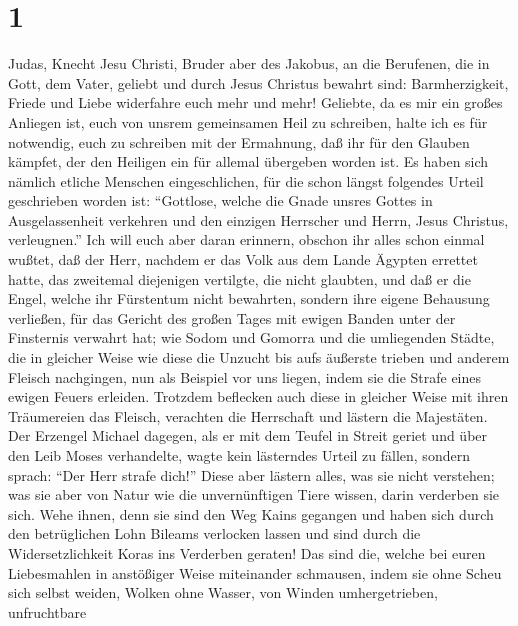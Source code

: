 \hypertarget{section}{%
\section{1}\label{section}}

 Judas, Knecht Jesu Christi, Bruder aber des Jakobus, an
die Berufenen, die in Gott, dem Vater, geliebt und durch Jesus Christus
bewahrt sind:  Barmherzigkeit, Friede und Liebe widerfahre
euch mehr und mehr!  Geliebte, da es mir ein großes
Anliegen ist, euch von unsrem gemeinsamen Heil zu schreiben, halte ich
es für notwendig, euch zu schreiben mit der Ermahnung, daß ihr für den
Glauben kämpfet, der den Heiligen ein für allemal übergeben worden ist.
 Es haben sich nämlich etliche Menschen eingeschlichen,
für die schon längst folgendes Urteil geschrieben worden ist:
``Gottlose, welche die Gnade unsres Gottes in Ausgelassenheit verkehren
und den einzigen Herrscher und Herrn, Jesus Christus, verleugnen.''
 Ich will euch aber daran erinnern, obschon ihr alles
schon einmal wußtet, daß der Herr, nachdem er das Volk aus dem Lande
Ägypten errettet hatte, das zweitemal diejenigen vertilgte, die nicht
glaubten,  und daß er die Engel, welche ihr Fürstentum
nicht bewahrten, sondern ihre eigene Behausung verließen, für das
Gericht des großen Tages mit ewigen Banden unter der Finsternis verwahrt
hat;  wie Sodom und Gomorra und die umliegenden Städte,
die in gleicher Weise wie diese die Unzucht bis aufs äußerste trieben
und anderem Fleisch nachgingen, nun als Beispiel vor uns liegen, indem
sie die Strafe eines ewigen Feuers erleiden.  Trotzdem
beflecken auch diese in gleicher Weise mit ihren Träumereien das
Fleisch, verachten die Herrschaft und lästern die Majestäten.
 Der Erzengel Michael dagegen, als er mit dem Teufel in
Streit geriet und über den Leib Moses verhandelte, wagte kein lästerndes
Urteil zu fällen, sondern sprach: ``Der Herr strafe dich!''
 Diese aber lästern alles, was sie nicht verstehen; was
sie aber von Natur wie die unvernünftigen Tiere wissen, darin verderben
sie sich.  Wehe ihnen, denn sie sind den Weg Kains
gegangen und haben sich durch den betrüglichen Lohn Bileams verlocken
lassen und sind durch die Widersetzlichkeit Koras ins Verderben geraten!
 Das sind die, welche bei euren Liebesmahlen in
anstößiger Weise miteinander schmausen, indem sie ohne Scheu sich selbst
weiden, Wolken ohne Wasser, von Winden umhergetrieben, unfruchtbare
